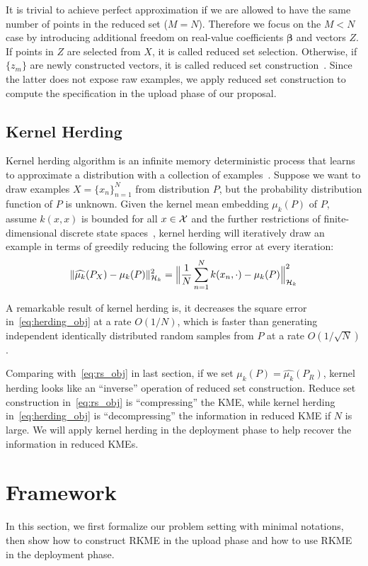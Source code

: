 \documentclass[paper=letter, fontsize=20pt]{article}
\begin{document}
It is trivial to achieve perfect approximation if we are allowed to have the same number of points in the reduced set ($M=N$). Therefore we focus on the $M<N$ case by introducing additional freedom on real-value coefficients $\bm{\beta}$ and vectors $Z$. If points in $Z$ are selected from $X$, it is called reduced set selection. Otherwise, if $\{z_m\}$ are newly constructed vectors, it is called reduced set construction~\citep{ICCV_rs}. Since the latter does not expose raw examples, we apply reduced set construction to compute the specification in the upload phase of our proposal.

\subsection{Kernel Herding}
Kernel herding algorithm is an infinite memory deterministic process that learns to approximate a distribution with a collection of examples~\citep{kernel_herding}. Suppose we want to draw examples $X=\{x_n\}_{n=1}^N$ from distribution $P$, but the probability distribution function of $P$ is unknown. Given the kernel mean embedding $\mu_k(P)$ of $P$, assume $k(x,x)$ is bounded for all $x\in \mathcal{X}$ and the further restrictions of finite-dimensional discrete state spaces~\citep{Welling09}, kernel herding will iteratively draw an example in terms of greedily reducing the following error at every iteration:
\begin{equation} \label{eq:herding_obj}
  \lVert\widehat{\mu_k}(P_X)-\mu_k(P)\rVert^2_{\mathcal{H}_k}=\Big\lVert \frac{1}{N}\sum_{n=1}^N k(x_n,\cdot) -\mu_k(P)\Big\rVert^2_{\mathcal{H}_k}
\end{equation}

A remarkable result of kernel herding is, it decreases the square error in~\eqref{eq:herding_obj} at a rate $O(1/N)$, which is faster than generating independent identically distributed random samples from $P$ at a rate $O(1/\sqrt{N})$.

Comparing with~\eqref{eq:rs_obj} in last section, if we set $\mu_k(P)=\widehat{\mu_k}(P_R)$, kernel herding looks like an ``inverse'' operation of reduced set construction. Reduce set construction in~\eqref{eq:rs_obj} is ``compressing'' the KME, while kernel herding in~\eqref{eq:herding_obj} is ``decompressing'' the information in reduced KME if $N$ is large. We will apply kernel herding in the deployment phase to help recover the information in reduced KMEs.

\section{Framework}
In this section, we first formalize our problem setting with minimal notations, then show how to construct RKME in the upload phase and how to use RKME in the deployment phase.
\end{document}
